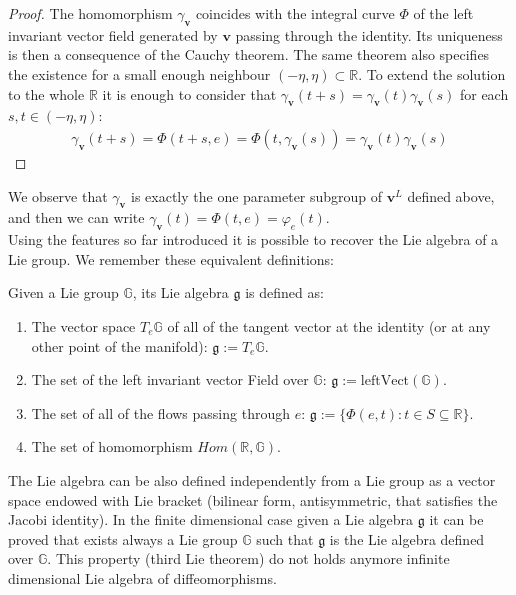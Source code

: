 \begin{proof}
	The homomorphism $\gamma_{\mathbf{v}}$ coincides with the integral curve $\Phi$ of the left invariant vector field generated by $\mathbf{v}$ passing through the identity. Its uniqueness is then a consequence of the Cauchy theorem. The same theorem also specifies the existence for a small enough neighbour $(-\eta,\eta)\subset \mathbb{R}$. To extend the solution to the whole $\mathbb{R}$ it is enough to consider that $\gamma_{\mathbf{v}}(t+s) = \gamma_{\mathbf{v}}(t) \gamma_{\mathbf{v}}(s)$ for each $s,t \in (-\eta,\eta)$:
	\begin{align*}
	\gamma_{\mathbf{v}}(t+s) = \Phi(t+s,e) =\Phi(t,\gamma_{\mathbf{v}}(s)) = \gamma_{\mathbf{v}}(t) \gamma_{\mathbf{v}}(s)
	\end{align*}
\end{proof}
We observe that $\gamma_{\mathbf{v}}$ is exactly the one parameter subgroup of $\mathbf{v}^{L}$ defined above, and then we can write $\gamma_{\mathbf{v}}(t) = \Phi(t,e) = \varphi_{e}(t)$.\\

Using the features so far introduced it is possible to recover the Lie algebra of a Lie group. We remember these equivalent definitions:
\begin{definition}
	Given a Lie group $\mathbb{G}$, its Lie algebra $\mathfrak{g}$ is defined as:
	\begin{enumerate}
		\item The vector space $T_{e}\mathbb{G}$  of all of the tangent vector at the identity (or at any other point of the manifold): $\mathfrak{g} := T_{e}\mathbb{G}$.
		\item The set of the left invariant vector Field over $\mathbb{G}$: $\mathfrak{g} := \text{left}\text{Vect}(\mathbb{G})$.
		\item The set of all of the flows passing through $e$:  $\mathfrak{g} := \{ \Phi(e,t) : t \in S\subseteq \mathbb{R} \}$.
		\item The set of homomorphism $Hom(\mathbb{R},\mathbb{G}) $.
	\end{enumerate}
\end{definition}
The Lie algebra can be also defined independently from a Lie group as a vector space endowed with Lie bracket (bilinear form, antisymmetric, that satisfies the Jacobi identity). In the finite dimensional case given a Lie algebra $\mathfrak{g}$ it can be proved that exists always a Lie group $\mathbb{G}$ such that $\mathfrak{g}$ is the Lie algebra defined over $\mathbb{G}$. This property (third Lie theorem) do not holds anymore infinite dimensional Lie algebra of diffeomorphisms.\\

